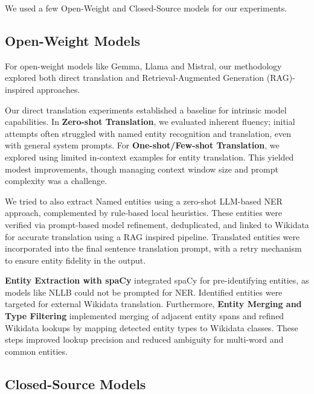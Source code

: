 \documentclass{ecai}
\begin{document}
We used a few Open-Weight and Closed-Source models for our experiments.

\subsection{Open-Weight Models}
For open-weight models like Gemma, Llama and Mistral, our methodology explored both direct translation
and Retrieval-Augmented Generation (RAG)-inspired approaches.

Our direct translation experiments established a baseline for intrinsic model capabilities. 
In \textbf{Zero-shot Translation}, we evaluated inherent fluency; initial attempts often struggled 
with named entity recognition and translation, even with general system prompts. 
For \textbf{One-shot/Few-shot Translation}, we explored using limited in-context examples for entity translation. 
This yielded modest improvements, though managing context window size and prompt complexity was a challenge.

We tried to also extract Named entities using a zero-shot LLM-based NER approach, complemented by 
rule-based local heuristics. 
These entities were verified via prompt-based model refinement, deduplicated, 
and linked to Wikidata for accurate translation using a RAG inspired pipeline. 
Translated entities were incorporated into the final sentence
translation prompt, with a retry mechanism to ensure entity fidelity in the output.

\textbf{Entity Extraction with spaCy} integrated spaCy for pre-identifying entities, 
as models like NLLB could not be prompted for NER. Identified entities were targeted for external Wikidata translation. 
Furthermore, \textbf{Entity Merging and Type Filtering} implemented merging of adjacent entity spans
and refined Wikidata lookups by mapping detected entity types to Wikidata classes. 
These steps improved lookup precision and reduced ambiguity for multi-word and common entities.

\subsection{Closed-Source Models}
\end{document}
